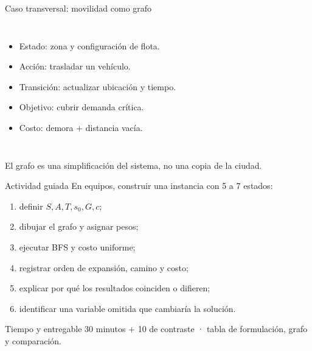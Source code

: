 \documentclass[aspectratio=169,11pt]{beamer}
\begin{document}
\begin{frame}{Caso transversal: movilidad como grafo}
  \begin{columns}[c]
      \centering
      \small
      \begin{itemize}
        \item Estado: zona y configuración de flota.
        \item Acción: trasladar un vehículo.
        \item Transición: actualizar ubicación y tiempo.
        \item Objetivo: cubrir demanda crítica.
        \item Costo: demora + distancia vacía.
      \end{itemize}
  \end{columns}
  \vfill
  \alert{El grafo es una simplificación del sistema, no una copia de la ciudad.}
\end{frame}

\begin{frame}{Actividad guiada}
  En equipos, construir una instancia con 5 a 7 estados:
  \begin{enumerate}
    \item definir $S,A,T,s_0,G,c$;
    \item dibujar el grafo y asignar pesos;
    \item ejecutar BFS y costo uniforme;
    \item registrar orden de expansión, camino y costo;
    \item explicar por qué los resultados coinciden o difieren;
    \item identificar una variable omitida que cambiaría la solución.
  \end{enumerate}
  \begin{block}{Tiempo y entregable}
    30 minutos + 10 de contraste · tabla de formulación, grafo y comparación.
  \end{block}
\end{frame}
\end{document}
